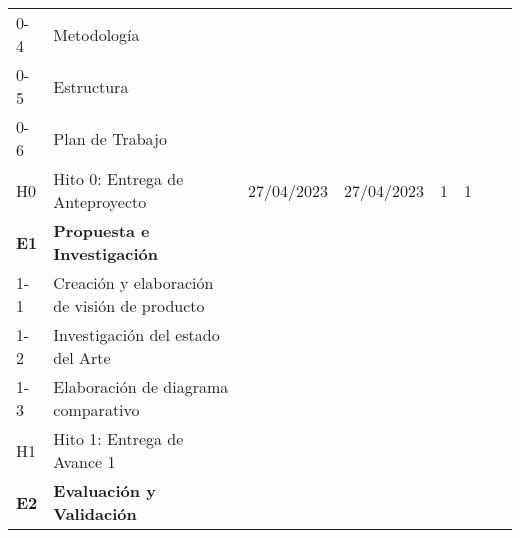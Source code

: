\begin{table}[H]
\begin{tabular}{llllllll}
		0-4                                                            & Metodología                                  &            &            &           &           &           &           \\
		0-5                                                            & Estructura                                   &            &            &           &           &           &           \\
		0-6                                                            & Plan de Trabajo                              &            &            &           &           &           &           \\
		\rowcolor[HTML]{ECF4FF}
		H0                                                             & Hito 0: Entrega de Anteproyecto              & 27/04/2023 & 27/04/2023 & 1         & 1         &           &           \\
		\rowcolor[HTML]{DAE8FC}
		\textbf{E1}                                                    & \textbf{Propuesta e Investigación}           & \textbf{}  & \textbf{}  & \textbf{} & \textbf{} & \textbf{} & \textbf{} \\
		1-1                                                            & Creación y elaboración de visión de producto &            &            &           &           &           &           \\
		1-2                                                            & Investigación del estado del Arte            &            &            &           &           &           &           \\
		1-3                                                            & Elaboración de diagrama comparativo          &            &            &           &           &           &           \\
		\rowcolor[HTML]{ECF4FF}
		H1                                                             & Hito 1: Entrega de Avance 1                  &            &            &           &           &           &           \\
		\rowcolor[HTML]{DAE8FC}
		\textbf{E2}                                                    & \textbf{Evaluación y Validación}             & \textbf{}  & \textbf{}  & \textbf{} & \textbf{} & \textbf{} & \textbf{}
	\end{tabular}
\end{table}
